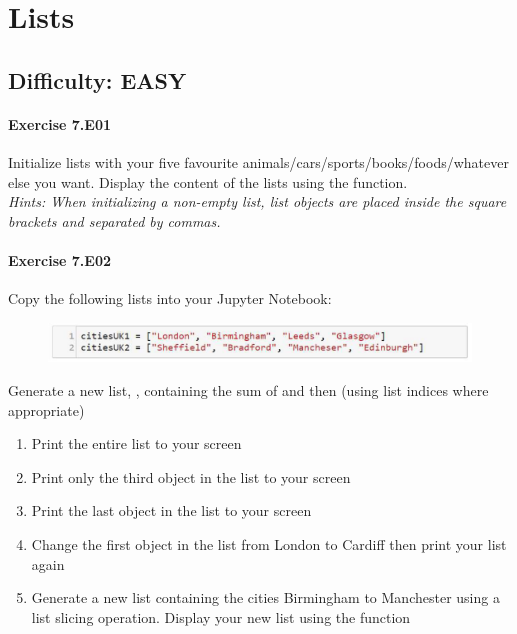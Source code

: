 \chapter{Lists}\label{CHAP_Lists}

\section{Difficulty: EASY}

\subsubsection*{Exercise 7.E01}
Initialize lists with your five favourite animals/cars/sports/books/foods/whatever else you
want. Display the content of the lists using the {} function.\\


\textit{Hints:
When initializing a non-empty list, list objects are placed inside the square brackets and
separated by commas.}\\[1cm]




\subsubsection*{Exercise 7.E02}
Copy the following lists into your Jupyter Notebook:
\begin{figure}[H]
		\centering
		\includegraphics[width=\textwidth]{../IMG/7E02.png} 
\end{figure}
Generate a new list, {}, containing the sum of {} and {} then (using list indices where appropriate)
\begin{enumerate}[label=(\alph*)]
	\item Print the entire list to your screen
	\item Print only the third object in the list to your screen
	\item Print the last object in the list to your screen
	\item Change the first object in the list from London to Cardiff then print your list again
	\item Generate a new list containing the cities Birmingham to Manchester using a list slicing operation. Display your new list using the {} function
\end{enumerate}


